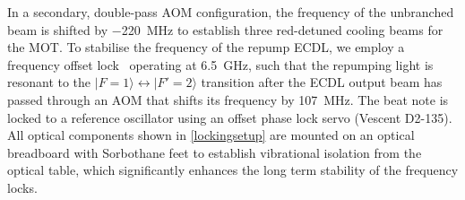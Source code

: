 \documentclass[../Thesis-IJspeert.tex]{subfiles}
\begin{document}
In a secondary, double-pass AOM configuration, the frequency of the unbranched beam is shifted by \SI{-220}{\mega\hertz} to establish three red-detuned cooling beams for the MOT. To stabilise the frequency of the repump ECDL, we employ a frequency offset lock~\cite{Schnemann1999} operating at \SI{6.5}{\giga\hertz}, such that the repumping light is resonant to the $ \vert F = 1\rangle \leftrightarrow \vert F' = 2 \rangle$ transition after the ECDL output beam has passed through an AOM that shifts its frequency by \SI{+107}{\mega\hertz}. The beat note is locked to a reference oscillator using an offset phase lock servo (Vescent D2-135). All optical components shown in \autoref{lockingsetup} are mounted on an optical breadboard with Sorbothane feet to establish vibrational isolation from the optical table, which significantly enhances the long term stability of the frequency locks.
\end{document}
